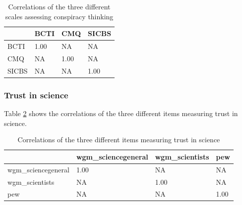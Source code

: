 \documentclass[
  doc,floatsintext]{apa6}
\begin{document}
\begin{table}[h]

\begin{center}
\begin{threeparttable}

\caption{\label{tab:exp3-correlation-conspiracy}Correlations of the three different scales assessing conspiracy thinking}

\begin{tabular}{llll}
\toprule
 & \multicolumn{1}{c}{BCTI} & \multicolumn{1}{c}{CMQ} & \multicolumn{1}{c}{SICBS}\\
\midrule
BCTI & 1.00 & NA & NA\\
CMQ & NA & 1.00 & NA\\
SICBS & NA & NA & 1.00\\
\bottomrule
\end{tabular}

\end{threeparttable}
\end{center}

\end{table}

\subsubsection{Trust in science}\label{trust-in-science-6}

Table \ref{tab:exp3-correlation-trust} shows the correlations of the three different items measuring trust in science.

\begin{table}[h]

\begin{center}
\begin{threeparttable}

\caption{\label{tab:exp3-correlation-trust}Correlations of the three different items measuring trust in science}

\begin{tabular}{llll}
\toprule
 & \multicolumn{1}{c}{wgm\_sciencegeneral} & \multicolumn{1}{c}{wgm\_scientists} & \multicolumn{1}{c}{pew}\\
\midrule
wgm\_sciencegeneral & 1.00 & NA & NA\\
wgm\_scientists & NA & 1.00 & NA\\
pew & NA & NA & 1.00\\
\bottomrule
\end{tabular}

\end{threeparttable}
\end{center}

\end{table}
\end{document}
